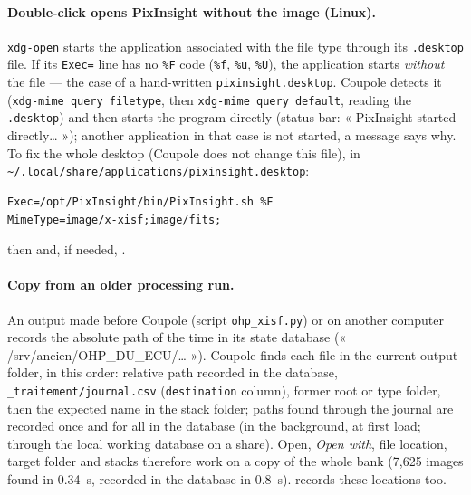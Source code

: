 \paragraph{Double-click opens PixInsight without the image (Linux).} \texttt{xdg-open} starts the application
associated with the file type through its \texttt{.desktop} file. If its \texttt{Exec=} line has no \texttt{\%F}
code (\texttt{\%f}, \texttt{\%u}, \texttt{\%U}), the application starts \emph{without} the file — the case of a
hand-written \texttt{pixinsight.desktop}. Coupole detects it (\texttt{xdg-mime query filetype}, then
\texttt{xdg-mime query default}, reading the \texttt{.desktop}) and then starts the program directly (status bar:
« PixInsight started directly… »); another application in that case is not started, a message says why. To fix the
whole desktop (Coupole does not change this file), in
\texttt{\textasciitilde/.local/share/applications/pixinsight.desktop}:
\begin{verbatim}
Exec=/opt/PixInsight/bin/PixInsight.sh %F
MimeType=image/x-xisf;image/fits;
\end{verbatim}
then  and, if needed,
.

\paragraph{Copy from an older processing run.} An output made before Coupole (script \texttt{ohp\_xisf.py}) or on
another computer records the absolute path of the time in its state database (« /srv/ancien/OHP\_DU\_ECU/… »).
Coupole finds each file in the current output folder, in this order: relative path recorded in the database,
\texttt{\_traitement/journal.csv} (\texttt{destination} column), former root or type folder, then the expected name
in the stack folder; paths found through the journal are recorded once and for all in the database (in the
background, at first load; through the local working database on a share). Open, \emph{Open with}, file location,
target folder and stacks therefore work on a copy of the whole bank (7,625 images found in 0.34~s, recorded in the
database in 0.8~s).  records these locations too.

